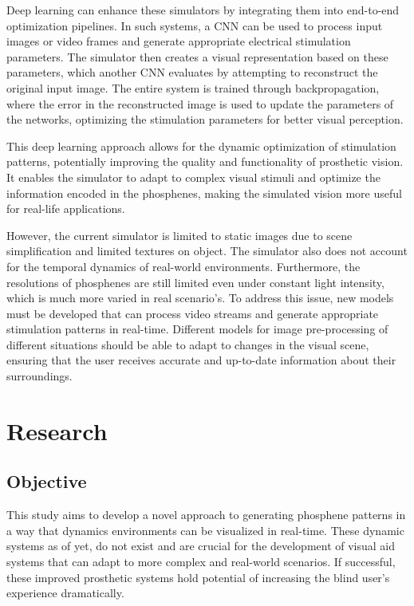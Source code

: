 \documentclass[10pt]{article}
\begin{document}
Deep learning can enhance these simulators by integrating them into end-to-end
optimization pipelines. In such systems, a CNN can be used to process input
images or video frames and generate appropriate electrical stimulation
parameters. The simulator then creates a visual representation based on these
parameters, which another CNN evaluates by attempting to reconstruct the
original input image. The entire system is trained through backpropagation,
where the error in the reconstructed image is used to update the parameters of
the networks, optimizing the stimulation parameters for better visual
perception.

This deep learning approach allows for the dynamic optimization of stimulation
patterns, potentially improving the quality and functionality of prosthetic
vision. It enables the simulator to adapt to complex visual stimuli and optimize
the information encoded in the phosphenes, making the simulated vision more
useful for real-life applications.


However, the current simulator is limited to static images due to scene
simplification and limited textures on object. The simulator also does not account for the temporal dynamics of real-world
environments. Furthermore, the resolutions of phosphenes are still limited even
under constant light intensity, which is much more varied in real scenario's. To
address this issue, new models must be developed that can process video streams
and generate appropriate stimulation patterns in real-time. Different models for
image pre-processing of different situations should be able to adapt to changes
in the visual scene, ensuring that the user receives accurate and up-to-date
information about their surroundings.

\pagestyle{rest} %

\section*{Research}\label{sec:research}
\subsection*{Objective}\label{subsec:objective}
This study aims to develop a novel approach to generating phosphene patterns in
a way that dynamics environments can be visualized in real-time. These dynamic
systems as of yet, do not exist and are crucial for the development of visual
aid systems that can adapt to more complex and real-world scenarios. If
successful, these improved prosthetic systems hold potential of increasing the
blind user's experience dramatically.
\end{document}
